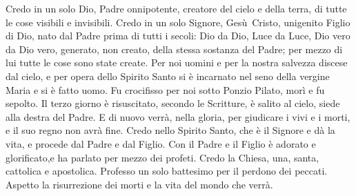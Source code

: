 Credo in un solo Dio, Padre onnipotente, creatore del cielo e della terra, di tutte le cose visibili e invisibili.
Credo in un solo Signore, Gesù~Cristo, unigenito Figlio di Dio, nato dal Padre prima di tutti i secoli:
Dio da Dio, Luce da Luce, Dio vero da Dio vero, generato, non creato, della stessa sostanza del Padre;
per mezzo di lui tutte le cose sono state create.
Per noi uomini e per la nostra salvezza discese dal cielo, e per opera dello Spirito Santo si è incarnato nel seno della vergine Maria e si è fatto uomo.
Fu crocifisso per noi sotto Ponzio Pilato, morì e fu sepolto.
Il terzo giorno è risuscitato, secondo le Scritture, è salito al cielo, siede alla destra del Padre.
E di nuovo verrà, nella gloria, per giudicare i vivi e i morti, e il suo regno non avrà fine.
Credo nello Spirito Santo, che è il Signore e dà la vita, e procede dal Padre e dal Figlio.
Con il Padre e il Figlio è adorato e glorificato,e ha parlato per mezzo dei profeti.
Credo la Chiesa, una, santa, cattolica e apostolica.
Professo un solo battesimo per il perdono dei peccati.
Aspetto la risurrezione dei morti e la vita del mondo che verrà.
\amen